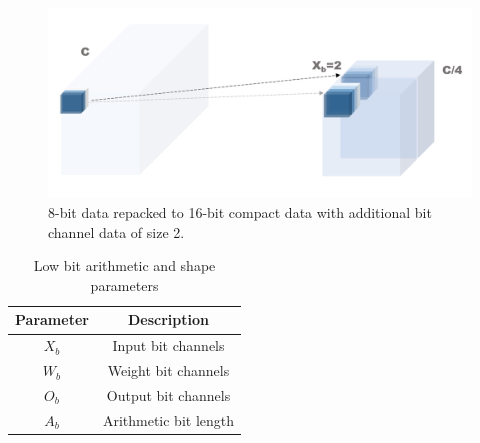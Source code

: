 \begin{figure}[h]
    \centering
    \includegraphics[width=1\linewidth]{inc/3_low_numeric_convolution_neural_network/figure/re_pack2.png}
    \caption{8-bit data repacked to 16-bit compact data with additional bit channel data of size 2.}
    \label{fig:re_pack2}
\end{figure}
\begin{table}[h]
    \caption{Low bit arithmetic and shape parameters}
    \label{tab:bit_shape}
    \centering
    \footnotesize 
        \begin{tabular}{cc}
        \toprule
        Parameter & Description \\
        \midrule
        $X_b$ & Input bit channels\\
        $W_b$ & Weight bit channels\\
        $O_b$ & Output bit channels\\
        $A_b$ & Arithmetic bit length\\
        \bottomrule
        \end{tabular}
\end{table}
